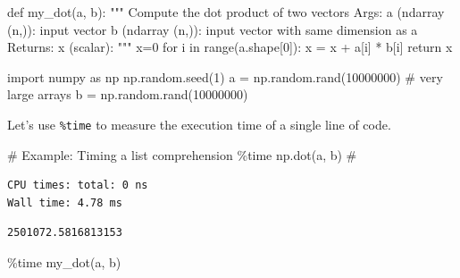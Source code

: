 \documentclass[
  letterpaper,
  DIV=11,
  numbers=noendperiod]{scrreprt}
\newenvironment{Shaded}{\begin{snugshade}}{\end{snugshade}}
\newcommand{\BuiltInTok}[1]{\textcolor[rgb]{0.00,0.23,0.31}{#1}}
\newcommand{\CommentTok}[1]{\textcolor[rgb]{0.37,0.37,0.37}{#1}}
\newcommand{\ControlFlowTok}[1]{\textcolor[rgb]{0.00,0.23,0.31}{#1}}
\newcommand{\DecValTok}[1]{\textcolor[rgb]{0.68,0.00,0.00}{#1}}
\newcommand{\ImportTok}[1]{\textcolor[rgb]{0.00,0.46,0.62}{#1}}
\newcommand{\KeywordTok}[1]{\textcolor[rgb]{0.00,0.23,0.31}{#1}}
\newcommand{\NormalTok}[1]{\textcolor[rgb]{0.00,0.23,0.31}{#1}}
\newcommand{\OperatorTok}[1]{\textcolor[rgb]{0.37,0.37,0.37}{#1}}
\begin{document}
\begin{Shaded}
\begin{Highlighting}[]
\KeywordTok{def}\NormalTok{ my\_dot(a, b): }
    \CommentTok{"""}
\CommentTok{   Compute the dot product of two vectors}
\CommentTok{ }
\CommentTok{    Args:}
\CommentTok{      a (ndarray (n,)):  input vector }
\CommentTok{      b (ndarray (n,)):  input vector with same dimension as a}
\CommentTok{    }
\CommentTok{    Returns:}
\CommentTok{      x (scalar): }
\CommentTok{    """}
\NormalTok{    x}\OperatorTok{=}\DecValTok{0}
    \ControlFlowTok{for}\NormalTok{ i }\KeywordTok{in} \BuiltInTok{range}\NormalTok{(a.shape[}\DecValTok{0}\NormalTok{]):}
\NormalTok{        x }\OperatorTok{=}\NormalTok{ x }\OperatorTok{+}\NormalTok{ a[i] }\OperatorTok{*}\NormalTok{ b[i]}
    \ControlFlowTok{return}\NormalTok{ x}
\end{Highlighting}
\end{Shaded}

\begin{Shaded}
\begin{Highlighting}[]
\ImportTok{import}\NormalTok{ numpy }\ImportTok{as}\NormalTok{ np}
\NormalTok{np.random.seed(}\DecValTok{1}\NormalTok{)}
\NormalTok{a }\OperatorTok{=}\NormalTok{ np.random.rand(}\DecValTok{10000000}\NormalTok{)  }\CommentTok{\# very large arrays}
\NormalTok{b }\OperatorTok{=}\NormalTok{ np.random.rand(}\DecValTok{10000000}\NormalTok{)}
\end{Highlighting}
\end{Shaded}

Let's use \texttt{\%time} to measure the execution time of a single line
of code.

\begin{Shaded}
\begin{Highlighting}[]
\CommentTok{\# Example: Timing a list comprehension}
\OperatorTok{\%}\NormalTok{time np.dot(a, b)}
\CommentTok{\# }
\end{Highlighting}
\end{Shaded}

\begin{verbatim}
CPU times: total: 0 ns
Wall time: 4.78 ms
\end{verbatim}

\begin{verbatim}
2501072.5816813153
\end{verbatim}

\begin{Shaded}
\begin{Highlighting}[]
\OperatorTok{\%}\NormalTok{time my\_dot(a, b)}
\end{Highlighting}
\end{Shaded}
\end{document}
